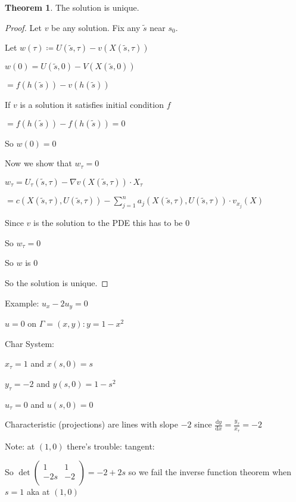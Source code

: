 \documentclass{article}
\theoremstyle{definition}
\newtheorem{theorem}{Theorem}
\begin{document}
\begin{theorem}
    The solution is unique.
\end{theorem}

\begin{proof}
    Let \(v\) be any solution. Fix any \(\tilde{s}\) near \(s_0\).

    Let \(w(\tau)\coloneqq U(\tilde{s},\tau)-v(X(\tilde{s},\tau))\)
    
    \(w(0)=U(\tilde{s},0)-V(X(\tilde{s},0))\) 

    \(= f(h(\tilde{s}))-v(h(\tilde{s}))\) 

    If \(v\) is a solution it satisfies initial condition \(f\) 

    \(=f(h(\tilde{s}))-f(h(\tilde{s}))=0\)
    
    So \(w(0)=0\) 

    Now we show that \(w_\tau=0\) 

    \(w_\tau = U_\tau(\tilde{s},\tau)-\nabla v(X(\tilde{s},\tau))\cdot X_\tau\) 

    \(= c(X(\tilde{s},\tau),U(\tilde{s},\tau))-\sum_{j=1}^n a_j(X(\tilde{s},\tau),U(\tilde{s},\tau))\cdot v_{x_j}(X)\) 

    Since \(v\) is the solution to the PDE this has to be \(0\) 

    So \(w_\tau = 0\)
    
    So \(w\) is \(0\) 

    So the solution is unique.
    
\end{proof}

Example: \(u_x - 2u_y = 0\)

\(u=0\) on \(\Gamma = (x,y):y=1-x^2\)

Char System:

\(x_\tau = 1\) and \(x(s,0)=s\) 

\(y_\tau = -2\) and \(y(s,0)=1-s^2\) 

\(u_\tau = 0\) and \(u(s,0)=0\) 

Characteristic (projections) are lines with slope \(-2\) since \(\frac{\mathrm{d}y}{\mathrm{d}x} = \frac{y_\tau}{x_\tau}=-2\) 

Note: at \((1,0)\) there's trouble: tangent:

So \(\det \begin{pmatrix}
    1 &  1 \\
    -2s &  -2 \\
\end{pmatrix}=-2+2s\) so we fail the inverse function theorem when \(s=1\) aka at \((1,0)\) 
\end{document}
